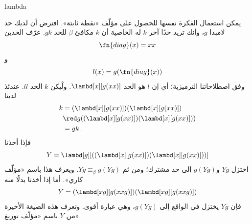 \documentclass[../../../include/open-logic-section]{subfiles}
\begin{document}
\begin{tagblock}{lambda}
\begin{digress}
يمكن استعمال الفكرة نفسها للحصول على مؤلّف «نقطة ثابتة». افترض أن
لديك حد لامبدا $g$، وأنك تريد حدًا آخر $k$ له الخاصية أن $k$ مكافئ
$\beta$ للحد $gk$. عرّف الحدين
\[
\fn{diag}(x) = xx
\]
و
\[
l(x) = g(\fn{diag}(x))
\]
وفق اصطلاحاتنا الترميزية؛ أي إن $l$ هو الحد
$\lambd[x][g(xx)]$. ولْيكن $k$ الحد $ll$. عندئذ لدينا
\begin{align*}
k & = (\lambd[x][g(xx)])(\lambd[x][g(xx)]) \\
& \red  g((\lambd[x][g(xx)])(\lambd[x][g(xx)])) \\
& = gk.
\end{align*}
فإذا أخذنا
\[
Y = \lambd[g][((\lambd[x][g(xx)])(\lambd[x][g(xx)]))]
\]
اختزل $Yg$ و$g(Yg)$ إلى حد مشترك؛ ومن ثم
$Yg \equiv_\beta g(Yg)$. ويعرف هذا باسم «مؤلّف كاري». أما إذا أخذنا
بدلًا منه
\[
Y = (\lambd[xg][g(xxg)])(\lambd[xg][g(xxg)])
\]
فإن $Yg$ يختزل في الواقع إلى $g(Yg)$، وهي عبارة أقوى. وتعرف هذه
الصيغة الأخيرة من $Y$ باسم «مؤلّف تورنغ».
\end{digress}
\end{tagblock}
\end{document}
